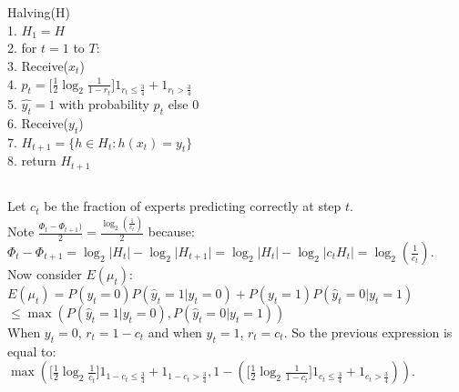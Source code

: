 \documentclass[]{article}
\begin{document}
\pagebreak

\section{}
\subsection{}
Halving(H)\\
1. $ H_1 = H$\\
2. for $t = 1$ to $T$:\\
3. \indent Receive($x_t$)\\
4. \indent $p_t = \lbrack \frac{1}{2} \log_2 \frac{1}{1-r_t}\rbrack 1_{r_t \le \frac{3}{4}} + 1_{r_t > \frac{3}{4}}$\\
5. \indent $\hat{y_t} = 1$ with probability $p_t$ else 0\\
6. \indent Receive($y_t$)\\
7. \indent $H_{t+1} = \lbrace {h \in H_t : h(x_t) = y_t} \rbrace $\\
8. return $H_{t+1}$

\subsection{}

Let $c_t$ be the fraction of experts predicting correctly at step $t$.\\
Note $\frac{\Phi_t - \Phi_{t+1})}{2} = \frac{\log_2(\frac{1}{c_t})}{2}$ because:\\

$\Phi_t - \Phi_{t+1} = \log_2 \vert H_t \vert - \log_2 \vert H_{t+1} \vert = \log_2 \vert H_t \vert - \log_2 \vert c_t H_{t} \vert = \log_2(\frac{1}{c_t})$.\\

\noindent Now consider $E(\mu_t)$:\\

$E(\mu_t) = P(y_t = 0) P(\hat{y}_t = 1 \vert y_t = 0) + P(y_t = 1) P(\hat{y}_t = 0 \vert y_t = 1)$\\

$\le \max(P(\hat{y}_t = 1 \vert y_t = 0), P(\hat{y}_t = 0 \vert y_t = 1))$ \\

\noindent When $y_t = 0$, $r_t = 1 - c_t$ and when $y_t = 1$, $r_t = c_t$. So the previous expression is equal to:\\

$\max(\lbrack \frac{1}{2} \log_2 \frac{1}{c_t} \rbrack 1_{1-c_t \le \frac{3}{4}} + 1_{1-c_t > \frac{3}{4}}, 1 - (\lbrack \frac{1}{2} \log_2 \frac{1}{1-c_t} \rbrack 1_{c_t \le \frac{3}{4}} + 1_{c_t > \frac{3}{4}}))$.\\
\end{document}
